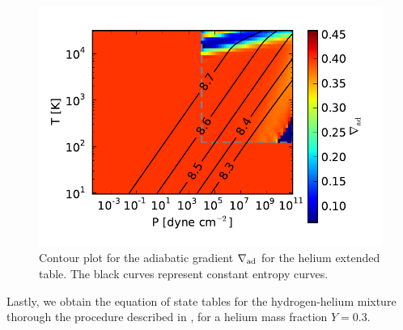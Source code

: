 \documentclass[apj]{emulateapj}
\newcommand{\delad}{\nabla_{\rm ad}}
\begin{document}
\begin{figure}[h!]
\centering
\includegraphics[scale=.8]{../../figs/EOS/delad_S_He.pdf}
\caption{Contour plot for the adiabatic gradient $\delad$ for the helium extended table. The black curves represent constant entropy curves.}
\end{figure}

\vspace{0.2in}

Lastly, we obtain the equation of state tables for the hydrogen-helium mixture thorough the procedure described in \citet{saumon95}, for a helium mass fraction $Y=0.3$.


%
%
%
%
\end{document}
